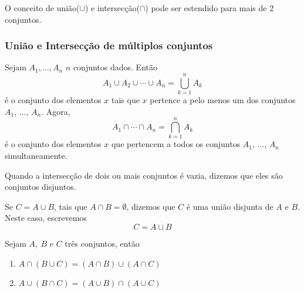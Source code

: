 O conceito de uni{\~a}o($ \cup $) e intersec{\c c}{\~a}o($ \cap $) pode ser estendido para mais de 2 conjuntos.

\subsubsection{Uni{\~a}o e Intersec{\c c}{\~a}o de m{\'u}ltiplos conjuntos}
\begin{definicao} Sejam $A_{1},...,A_{n}$ $n$ conjuntos dados. Ent{\~a}o
\[A_{1} \cup A_{2} \cup \cdots \cup A_{n}= \displaystyle\bigcup_{k=1}^{n} A_{k}\]
{\'e} o conjunto dos elementos $x$ tais que $x$ pertence a pelo menos um dos conjuntos $A_{1}$, ..., $A_{n}$. Agora,
\[A_{1} \cap \cdots \cap A_{n} = \displaystyle\bigcap_{k=1}^{n}A_{k}\]
{\'e} o conjunto dos elementos $x$ que pertencem a todos os conjuntos $A_{1}$, ..., $A_{n}$ simultaneamente.
\end{definicao}

Quando a intersec{\c c}{\~a}o de dois ou mais conjuntos {\'e} vazia, dizemos que eles s{\~a}o conjuntos disjuntos.

Se $C = A \cup B$, tais que $A \cap B = \emptyset$, dizemos que $C$ {\'e} uma uni{\~a}o disjunta de $A$ e $B$. Neste caso, escrevemos
\[C = A \sqcup B\]

\begin{proposicao} Sejam $A,\ B$ e $C$ tr{\^e}s conjuntos, ent{\~a}o
\begin{enumerate}
\item $A\cap(B\cup C)=(A\cap B)\cup(A\cap C)$
\item $A\cup(B\cap C)=(A\cup B)\cap(A\cup C)$
\end{enumerate}
\end{proposicao}

